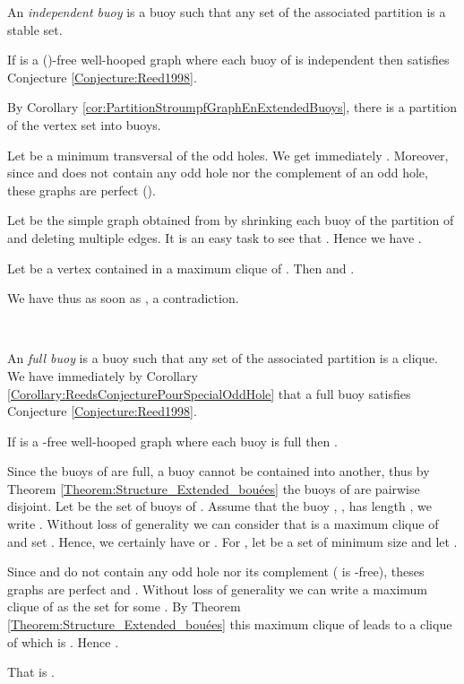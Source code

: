 \documentclass{amsart}
\theoremstyle{definition}
\theoremstyle{remark}
\newenvironment{prf}{{\bf \noindent Proof. } }{\hfill\\}
\newcommand{\wh}{well-hooped\xspace}
\newcommand{\extB}{buoy\xspace}
\newcommand{\extBs}{buoys\xspace}
\begin{document}
An {\em independent buoy} is a buoy such that any set of the associated partition is a stable set.



\begin{thm} \label{Theorem:Independent_Buoy} If  is a ()-free \wh graph where each buoy of  is independent then  satisfies Conjecture \ref{Conjecture:Reed1998}.
\end{thm}
\begin{prf}
By Corollary \ref{cor:PartitionStroumpfGraphEnExtendedBuoys}, there is a partition of the vertex set into \extBs.

Let  be a minimum transversal of the odd holes.
We get immediately .
Moreover, since   and  does not contain any odd hole nor the complement of an odd hole, these graphs are perfect (\cite{ChuRobSeyTho2006}).



Let  be the simple graph obtained from  by shrinking each \extB of the partition of  and deleting multiple edges.
It is an easy task to see that . Hence we have .


Let  be a vertex contained in a maximum clique of . Then  and .

We have thus
 as soon as , a contradiction.


\end{prf}

An {\em full \extB} is a \extB such that any set of the associated partition is a clique. We have immediately by Corollary \ref{Corollary:ReedsConjecturePourSpecialOddHole} 
that a full \extB satisfies Conjecture \ref{Conjecture:Reed1998}.




\begin{thm} \label{Theorem:Full_Buoy} If  is a -free \wh graph where each \extB is full then .
\end{thm}

\begin{prf}
Since the buoys of  are full, a buoy cannot be contained into another, thus  by Theorem \ref{Theorem:Structure_Extended_bouées} the buoys of  are pairwise disjoint. 
Let  be the set of buoys of . Assume that the buoy , , has length , we write . 
Without loss of generality we can consider that  is a maximum clique of  and set  . Hence, we certainly have  or .
For , let  be a set of minimum size and let .

Since  and  do not contain any odd hole nor its complement ( is -free), theses graphs are perfect
and . Without loss of generality we can write a maximum clique of  as the set  for some . By Theorem \ref{Theorem:Structure_Extended_bouées} 
this maximum clique of  leads to a clique of  which is . Hence .

That is .


\end{prf}
\end{document}
